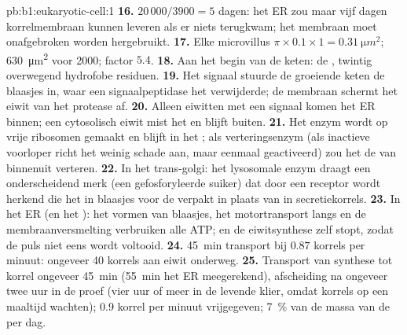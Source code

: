 \begin{solution}{pb:b1:eukaryotic-cell:1}
\textbf{16.} $20\,000/3900 = 5$ dagen: het ER zou maar vijf dagen
korrelmembraan kunnen leveren als er niets terugkwam; het membraan moet
onafgebroken worden hergebruikt.
\textbf{17.} Elke microvillus $\pi\times 0.1\times 1 =
\qty{0.31}{\micro m^2}$; \qty{630}{\micro m^2} voor 2000; factor $5.4$.
\textbf{18.} Aan het begin van de keten: de , twintig
overwegend hydrofobe residuen.
\textbf{19.} Het signaal stuurde de groeiende keten de blaasjes in, waar een
signaalpeptidase het verwijderde; de membraan schermt het eiwit van het protease
af.
\textbf{20.} Alleen eiwitten met een signaal komen het ER binnen; een cytosolisch
eiwit mist het en blijft buiten.
\textbf{21.} Het enzym wordt op vrije ribosomen gemaakt en blijft in het ;
als verteringsenzym (als inactieve voorloper richt het weinig schade aan, maar
eenmaal geactiveerd) zou het de  van binnenuit verteren.
\textbf{22.} In het trans-golgi: het lysosomale enzym draagt een onderscheidend
merk (een gefosforyleerde suiker) dat door een receptor wordt herkend die het in
blaasjes voor de  verpakt in plaats van in secretiekorrels.
\textbf{23.} In het ER (en het ): het vormen van blaasjes, het
motortransport langs  en de membraanversmelting verbruiken alle ATP;
en de eiwitsynthese zelf stopt, zodat de puls niet eens wordt voltooid.
\textbf{24.} \qty{45}{min} transport bij $0.87$ korrels per minuut: ongeveer
\qty{40}{} korrels aan eiwit onderweg.
\textbf{25.} Transport van synthese tot korrel ongeveer \qty{45}{min}
(\qty{55}{min} het ER meegerekend), afscheiding na ongeveer twee uur in de proef
(vier uur of meer in de levende klier, omdat korrels op een maaltijd wachten);
\qty{0.9}{} korrel per minuut vrijgegeven; \qty{7}{\%} van de massa van de 
per dag.
\end{solution}
